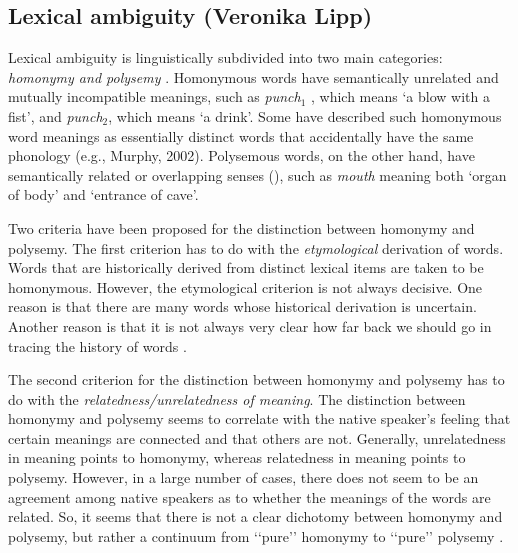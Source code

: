 \documentclass[11pt]{article}
\begin{document}
\subsection{Lexical ambiguity (Veronika Lipp)}

Lexical ambiguity is linguistically subdivided into two main categories:
\emph{homonymy and polysemy} \citep{Cruse:2004}. Homonymous words have semantically
unrelated and mutually incompatible meanings, such as \emph{punch$_1$} , which
means `a blow with a fist', and \emph{punch$_2$}, which means `a drink'. Some
have described such homonymous word meanings as essentially distinct words that
accidentally have the same phonology (e.g., Murphy, 2002). Polysemous words, on
the other hand, have semantically related or overlapping senses (\cite{Cruse:2004,Jackendoff:02, Pustejovsky:19995}), such as \emph{mouth} meaning both `organ
of body' and `entrance of cave'.

Two criteria have been proposed for the distinction between homonymy and
polysemy. The first criterion has to do with the \emph{etymological} derivation
of words. Words that are historically derived from distinct lexical items are
taken to be homonymous. However, the etymological criterion is not always
decisive. One reason is that there are many words whose historical derivation
is uncertain. Another reason is that it is not always very clear how far back
we should go in tracing the history of words \citep{Lyons:1977}.  

The second criterion for the distinction between homonymy and polysemy has to
do with the \emph{relatedness/unrelatedness of meaning}.  The distinction
between homonymy and polysemy seems to correlate with the native speaker’s
feeling that certain meanings are connected and that others are not. Generally,
unrelatedness in meaning points to homonymy, whereas relatedness in meaning
points to polysemy. 
However, in a large number of cases, there does not seem to be an agreement among native
speakers as to whether the meanings of the words are related. So, it seems that
there is not a clear dichotomy between homonymy and polysemy, but rather a
continuum from ‘‘pure’’ homonymy to ‘‘pure’’ polysemy \citep{Lyons:1977}.
\end{document}
